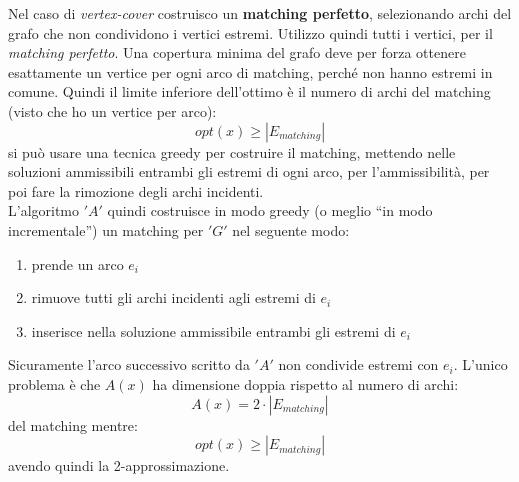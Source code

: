 										\begin{esempio}
											Nel caso di \textit{vertex-cover} costruisco un \textbf{matching perfetto},
											selezionando archi del grafo che non condividono i vertici estremi. Utilizzo
											quindi tutti i vertici, per il \textit{matching perfetto}. Una copertura minima
											del grafo deve per forza ottenere esattamente un vertice per ogni arco di
											matching, perché non hanno estremi in comune. Quindi il limite inferiore
											dell'ottimo è il numero di archi del matching (visto che ho un vertice per
											arco):
											\[opt(x)\geq |E_{matching}|\]
											si può usare una tecnica greedy per costruire il matching, mettendo nelle
											soluzioni ammissibili entrambi gli estremi di ogni arco, per l'ammissibilità,
											per poi fare la rimozione degli archi incidenti.\\
											L'algoritmo $ 'A' $ quindi costruisce in modo greedy (o meglio ``in modo
											incrementale'') un matching per $ 'G' $ nel seguente modo:
											\begin{enumerate}
												\item prende un arco $e_i$
												\item  rimuove tutti gli archi incidenti agli estremi
												      di $e_i$
												\item inserisce nella soluzione ammissibile entrambi gli estremi di $e_i$
											\end{enumerate}
											
											Sicuramente l'arco successivo scritto da $ 'A' $ non condivide estremi con
											$e_i$.
											L'unico problema è che $A(x)$ ha dimensione doppia rispetto al numero di archi:
											\[A(x)=2\cdot |E_{matching}|\]
											del matching mentre:
											\[opt(x)\geq |E_{matching}|\]
											avendo quindi la 2-approssimazione.
										\end{esempio}
										
